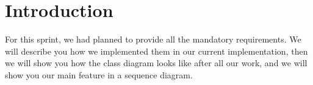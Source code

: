 \section{Introduction}

For this sprint, we had planned to provide all the mandatory requirements. We will describe you how we implemented them in our current implementation, then we will show you how the class diagram looks like after all our work, and we will show you our main feature in a sequence diagram.
